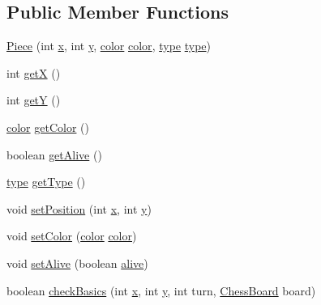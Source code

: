 \subsection*{Public Member Functions}
\begin{DoxyCompactItemize}
\item 
\hyperlink{classchess_game_1_1_piece_ae619cd0f65a29cc3bd4c05cd0810f189}{Piece} (int \hyperlink{classchess_game_1_1_piece_aeb2d3374492005d799aa6b7b85be40e7}{x}, int \hyperlink{classchess_game_1_1_piece_a56e4d8d18eca3fd03a6bd5d6112d6359}{y}, \hyperlink{classchess_game_1_1_piece_ad5117cbbbaebf3a27c4f3c2bcbd6678b}{color} \hyperlink{classchess_game_1_1_piece_ad5117cbbbaebf3a27c4f3c2bcbd6678b}{color}, \hyperlink{classchess_game_1_1_piece_a1370c7f61581a1b72fa8ac2fd1af70a2}{type} \hyperlink{classchess_game_1_1_piece_a1370c7f61581a1b72fa8ac2fd1af70a2}{type})
\item 
int \hyperlink{classchess_game_1_1_piece_a7edc54b17ccd974a8039bfc701e4077a}{getX} ()
\item 
int \hyperlink{classchess_game_1_1_piece_acce32235b9e4d7aaf3a8459076b275e1}{getY} ()
\item 
\hyperlink{classchess_game_1_1_piece_ad5117cbbbaebf3a27c4f3c2bcbd6678b}{color} \hyperlink{classchess_game_1_1_piece_ad5b774ec1d029e20473344fe4669c589}{get\+Color} ()
\item 
boolean \hyperlink{classchess_game_1_1_piece_a1710ae14c4a78b3b3853c00be581132c}{get\+Alive} ()
\item 
\hyperlink{classchess_game_1_1_piece_a1370c7f61581a1b72fa8ac2fd1af70a2}{type} \hyperlink{classchess_game_1_1_piece_a057dfd4e48c07779e9d38b440785b2cc}{get\+Type} ()
\item 
void \hyperlink{classchess_game_1_1_piece_afb94aa7d6183aa2bb93d279dd3c5af35}{set\+Position} (int \hyperlink{classchess_game_1_1_piece_aeb2d3374492005d799aa6b7b85be40e7}{x}, int \hyperlink{classchess_game_1_1_piece_a56e4d8d18eca3fd03a6bd5d6112d6359}{y})
\item 
void \hyperlink{classchess_game_1_1_piece_a6dc59207045601b9efb024cd9ee4ccd4}{set\+Color} (\hyperlink{classchess_game_1_1_piece_ad5117cbbbaebf3a27c4f3c2bcbd6678b}{color} \hyperlink{classchess_game_1_1_piece_ad5117cbbbaebf3a27c4f3c2bcbd6678b}{color})
\item 
void \hyperlink{classchess_game_1_1_piece_af3f395afe64554bc7160c92981de2434}{set\+Alive} (boolean \hyperlink{classchess_game_1_1_piece_a887a90577f888865d9ec706397415026}{alive})
\item 
boolean \hyperlink{classchess_game_1_1_piece_ae4e70dd293be0d4fc4fb6b8e2e8f471f}{check\+Basics} (int \hyperlink{classchess_game_1_1_piece_aeb2d3374492005d799aa6b7b85be40e7}{x}, int \hyperlink{classchess_game_1_1_piece_a56e4d8d18eca3fd03a6bd5d6112d6359}{y}, int turn, \hyperlink{classchess_game_1_1_chess_board}{Chess\+Board} board)
\end{DoxyCompactItemize}
